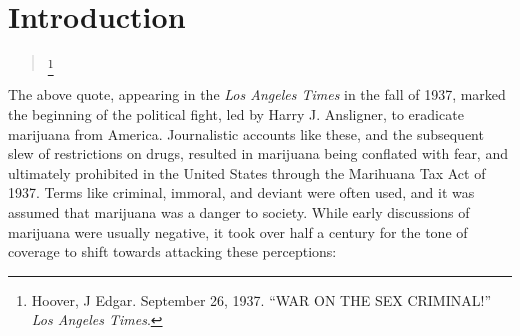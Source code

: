 \chapter{Introduction}
\begin{quotation}
\begin{singlespace}
\footnote{Hoover, J Edgar. September 26, 1937. ``WAR ON THE SEX CRIMINAL!'' \textit{Los Angeles Times}.}
\end{singlespace}
\end{quotation}
The above quote, appearing in the \textit{Los Angeles Times} in the fall of 1937, marked the beginning of the political fight, led by Harry J. Ansligner, to eradicate marijuana from America. Journalistic accounts like these, and the subsequent slew of restrictions on drugs, resulted in marijuana being conflated with fear, and ultimately prohibited in the United States through the Marihuana Tax Act of 1937. Terms like criminal, immoral, and deviant were often used, and it was assumed that marijuana was a danger to society. While early discussions of marijuana were usually negative, it took over half a century for the tone of coverage to shift towards attacking these perceptions:
